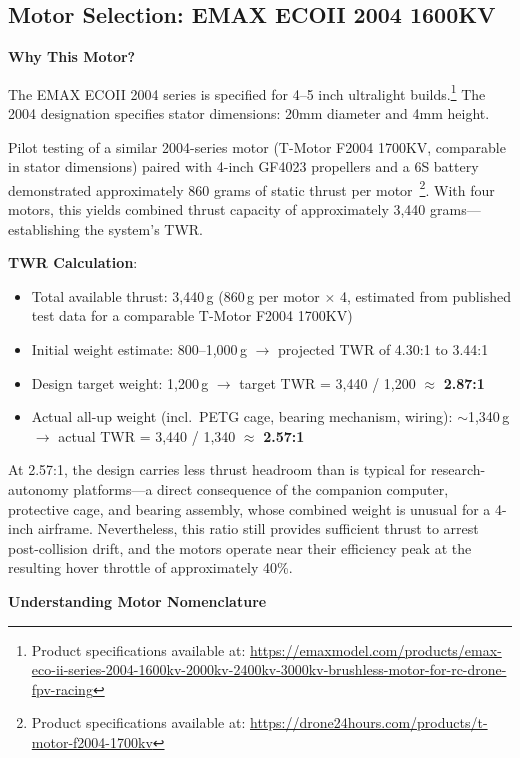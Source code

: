 \subsection{Motor Selection: EMAX ECOII 2004 1600KV}

\textbf{Why This Motor?}

The EMAX ECOII 2004 series is specified for 4--5 inch ultralight builds.\footnote{Product specifications available at: \url{https://emaxmodel.com/products/emax-eco-ii-series-2004-1600kv-2000kv-2400kv-3000kv-brushless-motor-for-rc-drone-fpv-racing}} The 2004 designation specifies stator dimensions: 20mm diameter and 4mm height.

Pilot testing of a similar 2004-series motor (T-Motor F2004 1700KV, comparable in stator dimensions) paired with 4-inch GF4023 propellers and a 6S battery demonstrated approximately 860 grams of static thrust per motor~\cite{bershadsky2016propulsion}\footnote{Product specifications available at: \url{https://drone24hours.com/products/t-motor-f2004-1700kv}}. With four motors, this yields combined thrust capacity of approximately 3,440 grams---establishing the system's TWR.

\textbf{TWR Calculation}:
\begin{itemize}
    \item Total available thrust: 3,440\,g (860\,g per motor $\times$ 4, estimated from published test data for a comparable T-Motor F2004 1700KV)
    \item Initial weight estimate: 800--1,000\,g $\rightarrow$ projected TWR of 4.30:1 to 3.44:1
    \item Design target weight: 1,200\,g $\rightarrow$ target TWR = 3,440 / 1,200 $\approx$ \textbf{2.87:1}
    \item Actual all-up weight (incl.\ PETG cage, bearing mechanism, wiring): $\sim$1,340\,g $\rightarrow$ actual TWR = 3,440 / 1,340 $\approx$ \textbf{2.57:1}
\end{itemize}

At 2.57:1, the design carries less thrust headroom than is typical for research-autonomy platforms---a direct consequence of the companion computer, protective cage, and bearing assembly, whose combined weight is unusual for a 4-inch airframe. Nevertheless, this ratio still provides sufficient thrust to arrest post-collision drift, and the motors operate near their efficiency peak at the resulting hover throttle of approximately 40\%.

\textbf{Understanding Motor Nomenclature}

